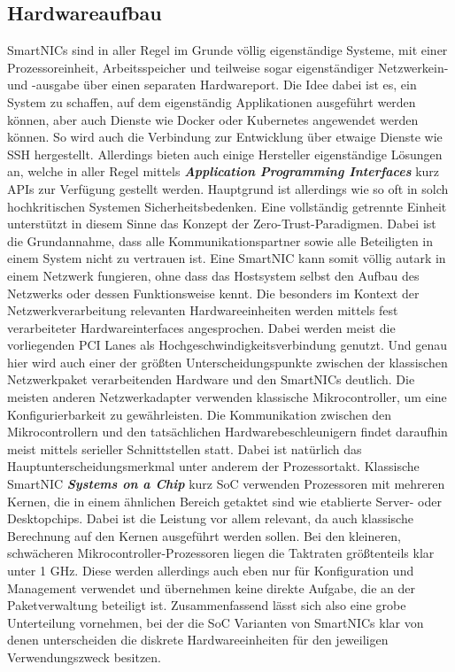 \subsection{Hardwareaufbau}
SmartNICs sind in aller Regel im Grunde völlig eigenständige Systeme, mit einer Prozessoreinheit, Arbeitsspeicher und teilweise sogar eigenständiger Netzwerkein- und -ausgabe über einen separaten Hardwareport. Die Idee dabei ist es, ein System zu schaffen, auf dem eigenständig Applikationen ausgeführt werden können, aber auch Dienste wie Docker oder Kubernetes angewendet werden können. So wird auch die Verbindung zur Entwicklung über etwaige Dienste wie SSH hergestellt. Allerdings bieten auch einige Hersteller eigenständige Lösungen an, welche in aller Regel mittels \textbf{\textit{Application Programming Interfaces}} kurz APIs zur Verfügung gestellt werden. Hauptgrund ist allerdings wie so oft in solch hochkritischen Systemen Sicherheitsbedenken. Eine vollständig getrennte Einheit unterstützt in diesem Sinne das Konzept der Zero-Trust-Paradigmen. Dabei ist die Grundannahme, dass alle Kommunikationspartner sowie alle Beteiligten in einem System nicht zu vertrauen ist. Eine SmartNIC kann somit völlig autark in einem Netzwerk fungieren, ohne dass das Hostsystem selbst den Aufbau des Netzwerks oder dessen Funktionsweise kennt. \cite{whatyouneedtoknowaboutsnics} Die besonders im Kontext der Netzwerkverarbeitung relevanten Hardwareeinheiten werden mittels fest verarbeiteter Hardwareinterfaces angesprochen. Dabei werden meist die vorliegenden PCI Lanes als Hochgeschwindigkeitsverbindung genutzt. Und genau hier wird auch einer der größten Unterscheidungspunkte zwischen der klassischen Netzwerkpaket verarbeitenden Hardware und den SmartNICs deutlich. Die meisten anderen Netzwerkadapter verwenden klassische Mikrocontroller, um eine Konfigurierbarkeit zu gewährleisten. Die Kommunikation zwischen den Mikrocontrollern und den tatsächlichen Hardwarebeschleunigern findet daraufhin meist mittels serieller Schnittstellen statt. Dabei ist natürlich das Hauptunterscheidungsmerkmal unter anderem der Prozessortakt. Klassische SmartNIC \textbf{\textit{Systems on a Chip}} kurz SoC verwenden Prozessoren mit mehreren Kernen, die in einem ähnlichen Bereich getaktet sind wie etablierte Server- oder Desktopchips. Dabei ist die Leistung vor allem relevant, da auch klassische Berechnung auf den Kernen ausgeführt werden sollen. Bei den kleineren, schwächeren Mikrocontroller-Prozessoren liegen die Taktraten größtenteils klar unter 1 GHz. Diese werden allerdings auch eben nur für Konfiguration und Management verwendet und übernehmen keine direkte Aufgabe, die an der Paketverwaltung beteiligt ist. Zusammenfassend lässt sich also eine grobe Unterteilung vornehmen, bei der die SoC Varianten von SmartNICs klar von denen unterscheiden die diskrete Hardwareeinheiten für den jeweiligen Verwendungszweck besitzen.
